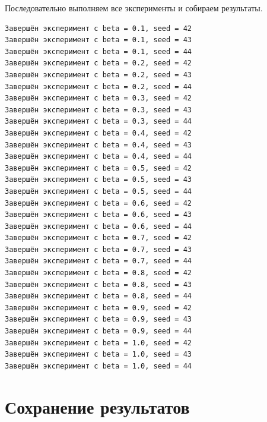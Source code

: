 \documentclass[
  12pt,
  a4paper,
  DIV=11,
  numbers=noendperiod]{scrreprt}
\newenvironment{Shaded}{\begin{snugshade}}{\end{snugshade}}
\newcommand{\ControlFlowTok}[1]{\textcolor[rgb]{0.00,0.23,0.31}{#1}}
\newcommand{\FunctionTok}[1]{\textcolor[rgb]{0.28,0.35,0.67}{#1}}
\newcommand{\KeywordTok}[1]{\textcolor[rgb]{0.00,0.23,0.31}{#1}}
\newcommand{\NormalTok}[1]{\textcolor[rgb]{0.00,0.23,0.31}{#1}}
\newcommand{\OperatorTok}[1]{\textcolor[rgb]{0.37,0.37,0.37}{#1}}
\newcommand{\SpecialCharTok}[1]{\textcolor[rgb]{0.37,0.37,0.37}{#1}}
\newcommand{\StringTok}[1]{\textcolor[rgb]{0.13,0.47,0.30}{#1}}
\begin{document}
Последовательно выполняем все эксперименты и собираем результаты.

\begin{Shaded}
\end{Shaded}

\begin{verbatim}
Завершён эксперимент с beta = 0.1, seed = 42
Завершён эксперимент с beta = 0.1, seed = 43
Завершён эксперимент с beta = 0.1, seed = 44
Завершён эксперимент с beta = 0.2, seed = 42
Завершён эксперимент с beta = 0.2, seed = 43
Завершён эксперимент с beta = 0.2, seed = 44
Завершён эксперимент с beta = 0.3, seed = 42
Завершён эксперимент с beta = 0.3, seed = 43
Завершён эксперимент с beta = 0.3, seed = 44
Завершён эксперимент с beta = 0.4, seed = 42
Завершён эксперимент с beta = 0.4, seed = 43
Завершён эксперимент с beta = 0.4, seed = 44
Завершён эксперимент с beta = 0.5, seed = 42
Завершён эксперимент с beta = 0.5, seed = 43
Завершён эксперимент с beta = 0.5, seed = 44
Завершён эксперимент с beta = 0.6, seed = 42
Завершён эксперимент с beta = 0.6, seed = 43
Завершён эксперимент с beta = 0.6, seed = 44
Завершён эксперимент с beta = 0.7, seed = 42
Завершён эксперимент с beta = 0.7, seed = 43
Завершён эксперимент с beta = 0.7, seed = 44
Завершён эксперимент с beta = 0.8, seed = 42
Завершён эксперимент с beta = 0.8, seed = 43
Завершён эксперимент с beta = 0.8, seed = 44
Завершён эксперимент с beta = 0.9, seed = 42
Завершён эксперимент с beta = 0.9, seed = 43
Завершён эксперимент с beta = 0.9, seed = 44
Завершён эксперимент с beta = 1.0, seed = 42
Завершён эксперимент с beta = 1.0, seed = 43
Завершён эксперимент с beta = 1.0, seed = 44
\end{verbatim}

\section{Сохранение
результатов}\label{ux441ux43eux445ux440ux430ux43dux435ux43dux438ux435-ux440ux435ux437ux443ux43bux44cux442ux430ux442ux43eux432-1}
\end{document}

